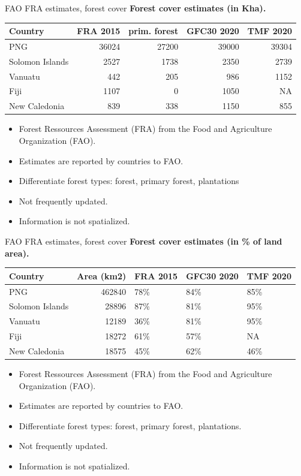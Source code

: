 \documentclass[10pt,table,dvipsnames,compress]{beamer}
\begin{document}
\begin{frame}[label={sec:org1d7887e}]{FAO FRA estimates, forest cover}
\textbf{Forest cover estimates (in Kha).}

\begin{center}
\footnotesize
\begin{tabular}{lrrrr}
Country & FRA 2015 & prim. forest & GFC30 2020 & TMF 2020\\[0pt]
\hline
PNG & 36024 & 27200 & 39000 & 39304\\[0pt]
Solomon Islands & 2527 & 1738 & 2350 & 2739\\[0pt]
Vanuatu & 442 & 205 & 986 & 1152\\[0pt]
Fiji & 1107 & 0 & 1050 & NA\\[0pt]
New Caledonia & 839 & 338 & 1150 & 855\\[0pt]
\end{tabular}
\end{center}

\begin{itemize}
\item Forest Ressources Assessment (FRA) from the Food and Agriculture Organization (FAO).
\item Estimates are reported by countries to FAO.
\item Differentiate forest types: forest, primary forest, plantations
\item Not frequently updated.
\item Information is not spatialized.
\end{itemize}
\end{frame}

\begin{frame}[label={sec:org811940b}]{FAO FRA estimates, forest cover}
\textbf{Forest cover estimates (in \% of land area).}

\begin{center}
\footnotesize
\begin{tabular}{lrlll}
Country & Area (km2) & FRA 2015 & GFC30 2020 & TMF 2020\\[0pt]
\hline
PNG & 462840 & 78\% & 84\% & 85\%\\[0pt]
Solomon Islands & 28896 & 87\% & 81\% & 95\%\\[0pt]
Vanuatu & 12189 & 36\% & 81\% & 95\%\\[0pt]
Fiji & 18272 & 61\% & 57\% & NA\\[0pt]
New Caledonia & 18575 & 45\% & 62\% & 46\%\\[0pt]
\end{tabular}
\end{center}

\begin{itemize}
\item Forest Ressources Assessment (FRA) from the Food and Agriculture Organization (FAO).
\item Estimates are reported by countries to FAO.
\item Differentiate forest types: forest, primary forest, plantations.
\item Not frequently updated.
\item Information is not spatialized.
\end{itemize}
\end{frame}
\end{document}

